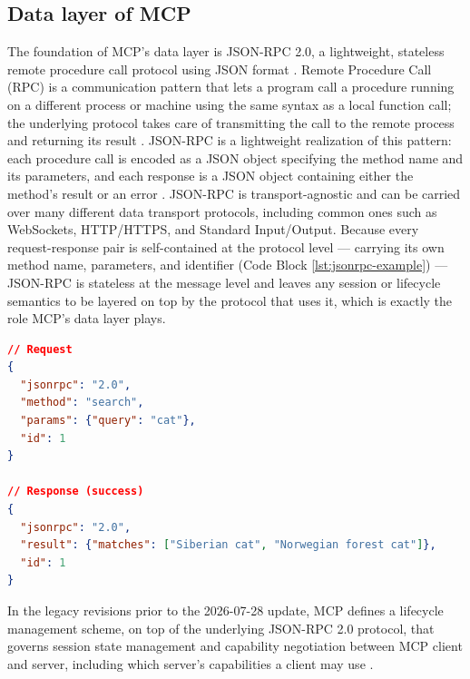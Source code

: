 \documentclass[english, 12pt, a4paper, elec, utf8, a-2b, online]{aaltothesis}
\begin{document}
\subsection{Data layer of MCP}
\label{sec:data_layer}
The foundation of MCP's data layer is JSON-RPC 2.0, a lightweight, stateless remote procedure call protocol using JSON format \cite{jsonrpc2020}. 
Remote Procedure Call (RPC) is a communication pattern that lets a program call a procedure running on a different process or machine using the same syntax as a local function call; the underlying protocol takes care of transmitting the call to the remote process and returning its result \cite{birrell1984implementing}. 
JSON-RPC is a lightweight realization of this pattern: each procedure call is encoded as a JSON object specifying the method name and its parameters, and each response is a JSON object containing either the method's result or an error \cite{jsonrpc2020}. 
JSON-RPC is transport-agnostic and can be carried over many different data transport protocols, including common ones such as WebSockets, HTTP/HTTPS, and Standard Input/Output. 
Because every request-response pair is self-contained at the protocol level --- carrying its own method name, parameters, and identifier (Code Block \ref{lst:jsonrpc-example}) --- JSON-RPC is stateless at the message level and leaves any session or lifecycle semantics to be layered on top by the protocol that uses it, which is exactly the role MCP's data layer plays.
\begin{lstlisting}[language=json, caption={A JSON-RPC 2.0 \cite{jsonrpc2020} request and response pair. The request object names the method to invoke (\texttt{search}) and its parameters (\texttt{query}), together with an \texttt{id} that lets the client match the eventual response to this specific call. The response shows a successful call, returning its \texttt{result} under the same \texttt{id}.}, label={lst:jsonrpc-example}]
// Request
{
  "jsonrpc": "2.0",
  "method": "search",
  "params": {"query": "cat"},
  "id": 1
}

// Response (success)
{
  "jsonrpc": "2.0",
  "result": {"matches": ["Siberian cat", "Norwegian forest cat"]},
  "id": 1
}

\end{lstlisting}
In the legacy revisions prior to the 2026-07-28 update, MCP defines a lifecycle management scheme, on top of the underlying JSON-RPC 2.0 protocol, that governs session state management and capability negotiation between MCP client and server, including which server's capabilities a client may use \cite{mcpspec2025}. 
\end{document}
